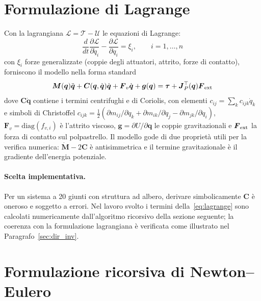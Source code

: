 \section{Formulazione di Lagrange}
\label{sec:lagrange}

Con la lagrangiana $\mathcal L= \mathcal T - \mathcal U$ le equazioni di Lagrange:
\begin{equation}
    \frac{d}{dt}\frac{\partial\mathcal L}{\partial\dot q_i}-\frac{\partial\mathcal L}{\partial q_i}=\xi_i,\qquad i=1,\dots,n
\end{equation}
con $\xi_i$ forze generalizzate (coppie degli attuatori, attrito, forze di contatto), forniscono il modello nella forma standard
\begin{equation}
    \boldsymbol M(\boldsymbol q)\ddot{\boldsymbol q}+\boldsymbol C(\boldsymbol q,\dot{\boldsymbol q})\dot{\boldsymbol q}+\boldsymbol F_v\dot{\boldsymbol q}+\boldsymbol g(\boldsymbol q)=\boldsymbol\tau+\boldsymbol J_P^\top(\boldsymbol q)\boldsymbol F_{\rm ext}
    \label{eq:lagrange}
\end{equation}
dove $\boldsymbol C\dot{\boldsymbol q}$ contiene i termini centrifughi e di Coriolis, con elementi $c_{ij}=\sum_k c_{ijk}\dot q_k$ e simboli di Christoffel $c_{ijk}=\frac12\left(\partial m_{ij}/\partial q_k+\partial m_{ik}/\partial q_j-\partial m_{jk}/\partial q_i\right)$, $\boldsymbol F_v=\mathrm{diag}(f_{v,i})$ è l'attrito viscoso, $\boldsymbol g=\partial U/\partial\boldsymbol q$ le coppie gravitazionali e $\boldsymbol F_{\rm ext}$ la forza di contatto sul polpastrello. 
Il modello gode di due proprietà utili per la verifica numerica: $\dot{\boldsymbol M}-2\boldsymbol C$ è antisimmetrica e il termine gravitazionale è il gradiente dell'energia potenziale.

\paragraph{Scelta implementativa.} Per un sistema a 20 giunti con struttura ad albero, derivare simbolicamente $\boldsymbol C$ è oneroso e soggetto a errori. Nel lavoro svolto i termini della~\eqref{eq:lagrange} sono calcolati numericamente dall'algoritmo ricorsivo della sezione seguente; la coerenza con la formulazione lagrangiana è verificata come illustrato nel Paragrafo~\ref{sec:dir_inv}.

\section{Formulazione ricorsiva di Newton--Eulero}
\label{sec:newton_euler}

